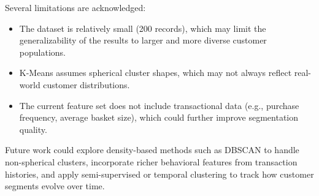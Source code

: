 \documentclass[12pt,a4paper]{article}
\begin{document}
Several limitations are acknowledged:

\begin{itemize}
    \item The dataset is relatively small (200 records), which may limit the generalizability of the results to larger and more diverse customer populations.
    \item K-Means assumes spherical cluster shapes, which may not always reflect real-world customer distributions.
    \item The current feature set does not include transactional data (e.g., purchase frequency, average basket size), which could further improve segmentation quality.
\end{itemize}

Future work could explore density-based methods such as DBSCAN to handle non-spherical clusters, incorporate richer behavioral features from transaction histories, and apply semi-supervised or temporal clustering to track how customer segments evolve over time.
\end{document}
